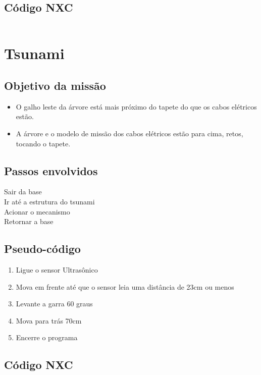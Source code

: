 \documentclass[12pt,a4paper]{article}
\begin{document}
	\subsection{Código NXC}
		\inputminted[linenos, frame = single]{c}{../GalhoArvore.nxc}

\newpage
\section{Tsunami}
	\subsection{Objetivo da missão}
		\begin{itemize}
			\item O galho leste da árvore está mais próximo do tapete do que os 
			cabos elétricos estão.
			\item A árvore e o modelo de missão dos cabos elétricos estão para 
			cima, retos, tocando o tapete.
		\end{itemize}

	\subsection{Passos envolvidos}
		Sair da base\\
		Ir até a estrutura do tsunami\\
		Acionar o mecanismo\\
		Retornar a base\\

	\subsection{Pseudo-código}
		\begin{enumerate}
			\item Ligue o sensor Ultrasônico
			\item Mova em frente até que o sensor leia uma distância de 23cm ou 
			menos
			\item Levante a garra 60 graus
			\item Mova para trás 70cm
			\item Encerre o programa
		\end{enumerate}

	\subsection{Código NXC}
		\inputminted[linenos, frame = single]{c}{../Ondas.nxc}
\end{document}
